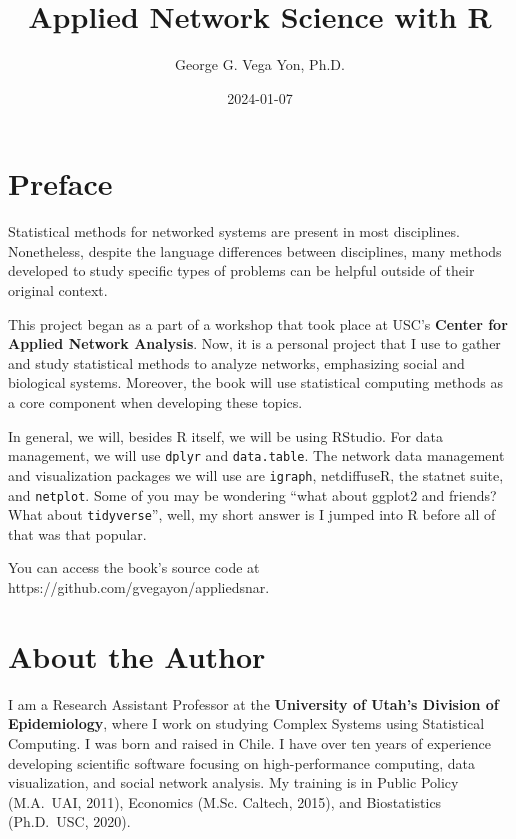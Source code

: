 \documentclass[
]{book}
\title{Applied Network Science with R}
\author{George G. Vega Yon, Ph.D.}
\date{2024-01-07}
\begin{document}
\maketitle

{
\setcounter{tocdepth}{1}
\tableofcontents
}
\hypertarget{preface}{%
\chapter{Preface}\label{preface}}

\renewcommand{\Pr}[1]{\mbox{Pr}\left(#1\right)}
\renewcommand{\exp}[1]{\mbox{exp}\left\{#1\right\}}

Statistical methods for networked systems are present in most disciplines. Nonetheless, despite the language differences between disciplines, many methods developed to study specific types of problems can be helpful outside of their original context.

This project began as a part of a workshop that took place at USC's \textbf{Center for Applied Network Analysis}. Now, it is a personal project that I use to gather and study statistical methods to analyze networks, emphasizing social and biological systems. Moreover, the book will use statistical computing methods as a core component when developing these topics.

In general, we will, besides R itself, we will be using RStudio. For data management, we will use \texttt{dplyr} and \texttt{data.table}. The network data management and visualization packages we will use are \texttt{igraph}, netdiffuseR, the statnet suite, and \texttt{netplot}. Some of you may be wondering ``what about ggplot2 and friends? What about \texttt{tidyverse}'', well, my short answer is I jumped into R before all of that was that popular.

You can access the book's source code at https://github.com/gvegayon/appliedsnar.

\hypertarget{about-the-author}{%
\chapter{About the Author}\label{about-the-author}}

I am a Research Assistant Professor at the \textbf{University of Utah's Division of Epidemiology}, where I work on studying Complex Systems using Statistical Computing. I was born and raised in Chile. I have over ten years of experience developing scientific software focusing on high-performance computing, data visualization, and social network analysis. My training is in Public Policy (M.A.~UAI, 2011), Economics (M.Sc. Caltech, 2015), and Biostatistics (Ph.D.~USC, 2020).
\end{document}
